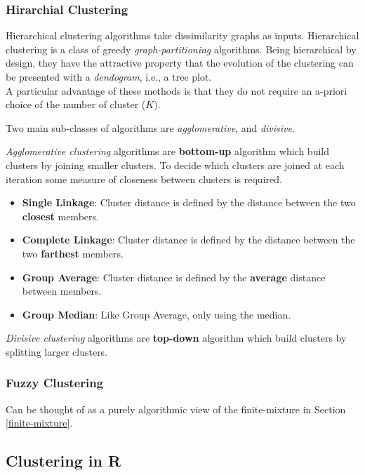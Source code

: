 \documentclass[]{book}
\providecommand{\tightlist}{%
  \setlength{\itemsep}{0pt}\setlength{\parskip}{0pt}}
\theoremstyle{definition}
\theoremstyle{definition}
\theoremstyle{definition}
\theoremstyle{remark}
\begin{document}
\subsubsection{Hirarchial Clustering}\label{hirarchial-clustering}

Hierarchical clustering algorithms take dissimilarity graphs as inputs.
Hierarchical clustering is a class of greedy \emph{graph-partitioning}
algorithms. Being hierarchical by design, they have the attractive
property that the evolution of the clustering can be presented with a
\emph{dendogram}, i.e., a tree plot.\\
A particular advantage of these methods is that they do not require an
a-priori choice of the number of cluster (\(K\)).

Two main sub-classes of algorithms are \emph{agglomerative}, and
\emph{divisive}.

\emph{Agglomerative clustering} algorithms are \textbf{bottom-up}
algorithm which build clusters by joining smaller clusters. To decide
which clusters are joined at each iteration some measure of closeness
between clusters is required.

\begin{itemize}
\tightlist
\item
  \textbf{Single Linkage}: Cluster distance is defined by the distance
  between the two \textbf{closest} members.
\item
  \textbf{Complete Linkage}: Cluster distance is defined by the distance
  between the two \textbf{farthest} members.
\item
  \textbf{Group Average}: Cluster distance is defined by the
  \textbf{average} distance between members.
\item
  \textbf{Group Median}: Like Group Average, only using the median.
\end{itemize}

\emph{Divisive clustering} algorithms are \textbf{top-down} algorithm
which build clusters by splitting larger clusters.

\subsubsection{Fuzzy Clustering}\label{fuzzy-clustering}

Can be thought of as a purely algorithmic view of the finite-mixture in
Section \ref{finite-mixture}.

\subsection{Clustering in R}\label{clustering-in-r}
\end{document}
